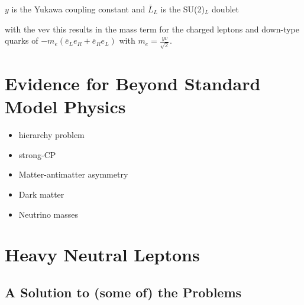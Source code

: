 $y$ is the Yukawa coupling constant and $\bar{L}_L$ is the SU(2)$_L$ doublet


with the vev this results in the mass term for the charged leptons and down-type quarks of $-m_e(\bar{e}_L e_R + \bar{e}_R e_L)$ with $m_e = \frac{y v}{\sqrt{2}}$.


\section{Evidence for Beyond Standard Model Physics}

\begin{itemize}
    \item hierarchy problem
    \item strong-CP
    \item Matter-antimatter asymmetry
    \item Dark matter
    \item Neutrino masses
\end{itemize}


\section{Heavy Neutral Leptons} 

\subsection{A Solution to (some of) the Problems}


